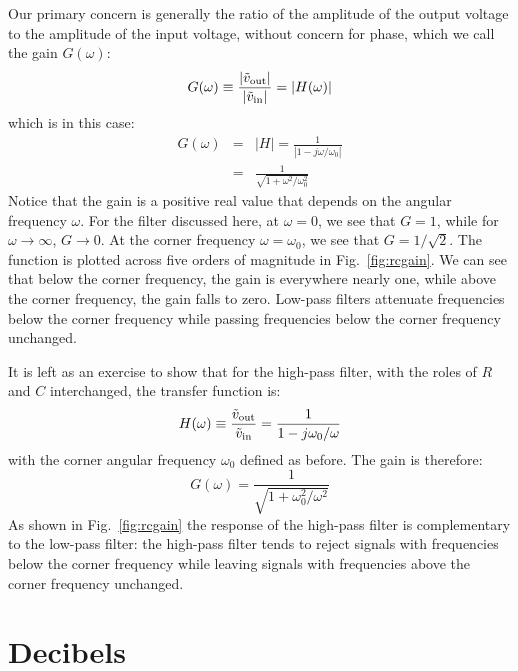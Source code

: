 \documentclass[12pt,oneside]{book}
\begin{document}
Our primary concern is generally the ratio of the amplitude of the output voltage to the amplitude of the input voltage, without concern for phase, which we call the gain $G(\omega)$:
\begin{equation*}
G(\omega) \equiv \frac{|\tilde{v}_{\rm out}|}{|\tilde{v}_{\rm in}|} = |H(\omega)| 
\end{equation*}
which is in this case:
\begin{eqnarray*}
G(\omega) &=& |H| = \frac{1}{|1 - j \omega/\omega_0 |}\\
&=& \frac{1}{\sqrt{1+\omega^2/\omega_0^2}}
\end{eqnarray*}
Notice that the gain is a positive real value that depends on the angular frequency $\omega$.
For the filter discussed here, at $\omega=0$, we see that $G=1$, while for $\omega \to \infty$, $G \to 0$.
At the corner frequency $\omega = \omega_0$, we see that $G = 1/\sqrt{2}$.
The function is plotted across five orders of magnitude in Fig.~\ref{fig:rcgain}.
We can see that below the corner frequency, the gain is everywhere nearly one, while above the corner frequency, the gain falls to zero.  Low-pass filters attenuate frequencies below the corner frequency while passing frequencies below the corner frequency unchanged.

It is left as an exercise to show that for the high-pass filter, with the roles of $R$ and $C$ interchanged, the transfer function is:
\begin{equation*}
H(\omega) \equiv \frac{\tilde{v}_{\rm out}}{\tilde{v}_{\rm in}} = \frac{1}{1 - j \omega_0/\omega}\\
\end{equation*}
with the corner angular frequency $\omega_0$ defined as before.  The gain is therefore:
\begin{equation*}
G(\omega) = \frac{1}{\sqrt{1+\omega_0^2/\omega^2}}
\end{equation*}
As shown in Fig.~\ref{fig:rcgain} the response of the high-pass filter is complementary to the low-pass filter:  the high-pass filter tends to reject signals with frequencies below the corner frequency while leaving signals with frequencies above the corner frequency unchanged.

\section{Decibels}
\end{document}
